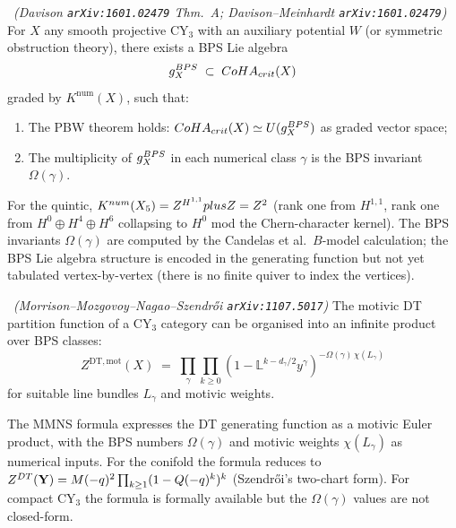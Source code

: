\begin{proposition}
\label{prop:davison-bps}
\ClaimStatusProvedElsewhere\
\emph{(Davison \texttt{arXiv:1601.02479} Thm.~A;
Davison--Meinhardt \texttt{arXiv:1601.02479})}
For $X$ any smooth projective CY$_3$ with an auxiliary potential $W$
(or symmetric obstruction theory), there exists a BPS Lie algebra
\[
  g_X^{BPS} \;\subset\; CoHA_{crit}(X)
\]
graded by $K^{\mathrm{num}}(X)$, such that:
\begin{enumerate}[leftmargin=2em]
\item The PBW theorem holds: $CoHA_{crit}(X) \simeq
  U(g_X^{BPS})$ as graded vector space;
\item The multiplicity of $g_X^{BPS}$ in each numerical class
  $\gamma$ is the BPS invariant $\Omega(\gamma)$.
\end{enumerate}
\end{proposition}

For the quintic, $K^{num}(X_5) = Z^{H^{1,1}} plus Z = Z^2$
(rank one from $H^{1,1}$, rank one from $H^0 \oplus H^4 \oplus H^6$
collapsing to $H^0$ mod the Chern-character kernel). The BPS invariants
$\Omega(\gamma)$ are computed by the Candelas et al.\ $B$-model
calculation; the BPS Lie algebra structure is encoded in the
generating function but not yet tabulated vertex-by-vertex (there is no
finite quiver to index the vertices).

\begin{proposition}
\label{prop:mmns-motivic}
\ClaimStatusProvedElsewhere\
\emph{(Morrison--Mozgovoy--Nagao--Szendrői
\texttt{arXiv:1107.5017})}
The motivic DT partition function of a CY$_3$ category can be organised
into an infinite product over BPS classes:
\[
  Z^{\mathrm{DT,mot}}(X) \;=\;
  \prod_{\gamma} \prod_{k \geq 0}
  \left(1 - \mathbb{L}^{k - d_\gamma/2} y^\gamma\right)^{-\Omega(\gamma)
    \,\chi(L_\gamma)}
\]
for suitable line bundles $L_\gamma$ and motivic weights.
\end{proposition}

The MMNS formula expresses the DT generating function as a motivic
Euler product, with the BPS numbers $\Omega(\gamma)$ and motivic
weights $\chi(L_\gamma)$ as numerical inputs. For the conifold the
formula reduces to $Z^{DT}(\mathbf{Y}) = M(-q)^2 \prod_{k \geq 1}(1 -
Q(-q)^k)^k$ (Szendrői's two-chart form). For compact CY$_3$ the formula
is formally available but the $\Omega(\gamma)$ values are not
closed-form.

